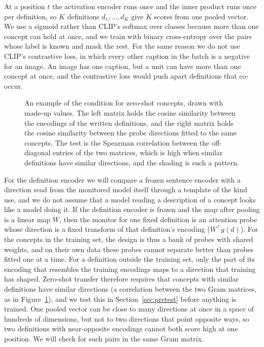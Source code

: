 \documentclass{article}
\begin{document}
At a position $t$ the activation encoder runs once and the inner product runs once per definition, so $K$ definitions $d_1,\dots,d_K$ give $K$ scores from one pooled vector. We use a sigmoid rather than CLIP's softmax over classes because more than one concept can hold at once, and we train with binary cross-entropy over the pairs whose label is known and mask the rest. For the same reason we do not use CLIP's contrastive loss, in which every other caption in the batch is a negative for an image. An image has one caption, but a unit can have more than one concept at once, and the contrastive loss would push apart definitions that co-occur.

\begin{figure}[t]
\centering
\resizebox{0.56\textwidth}{!}{}
\caption{An example of the condition for zero-shot concepts, drawn with made-up values. The left matrix holds the cosine similarity between the encodings of the written definitions, and the right matrix holds the cosine similarity between the probe directions fitted to the same concepts. The test is the Spearman correlation between the off-diagonal entries of the two matrices, which is high when similar definitions have similar directions, and the shading is such a pattern.}
\label{fig:pretest}
\end{figure}

For the definition encoder we will compare a frozen sentence encoder with a direction read from the monitored model itself through a template of the kind \cite{zou2023} use, and we do not assume that a model reading a description of a concept looks like a model doing it. If the definition encoder is frozen and the map after pooling is a linear map $W$, then the monitor for one fixed definition is an attention probe whose direction is a fixed transform of that definition's encoding ($W^\top g(d)$). For the concepts in the training set, the design is thus a bank of probes with shared weights, and on their own data these probes cannot separate better than probes fitted one at a time. For a definition outside the training set, only the part of its encoding that resembles the training encodings maps to a direction that training has shaped. Zero-shot transfer therefore requires that concepts with similar definitions have similar directions (a correlation between the two Gram matrices, as in Figure~\ref{fig:pretest}), and we test this in Section~\ref{sec:pretest} before anything is trained. One pooled vector can be close to many directions at once in a space of hundreds of dimensions, but not to two directions that point opposite ways, so two definitions with near-opposite encodings cannot both score high at one position. We will check for such pairs in the same Gram matrix.
\end{document}
